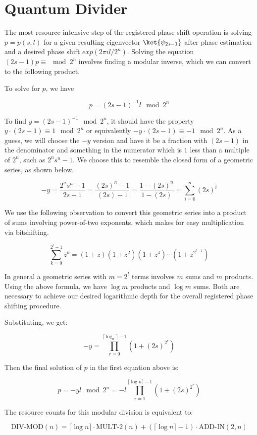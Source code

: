 \section{Quantum Divider}

The most resource-intensive step of the registered phase shift operation
is solving $p = p(s,l)$ for a given resulting
eigenvector $\ket{\psi_{2s-1}}$ after phase estimation and a desired
phase shift $exp(2\pi i l / 2^n)$. Solving the equation
$(2s-1)p \equiv \mod 2^n$ involves finding a modular inverse, which
we can convert to the following product.

To solve for $p$, we have

\begin{displaymath}
p = (2s - 1)^{-1} l \mod 2^n
\end{displaymath}

To find $y = (2s-1)^{-1} \mod 2^n$, it should have the property
$y \cdot (2s-1) \equiv 1 \mod 2^n$ or equivalently
$-y \cdot (2s-1) \equiv -1 \mod 2^n$. As a guess, we will choose the
$-y$ version and have it be a fraction with $(2s-1)$ in the denominator and
something in the numerator which is $1$ less than a multiple of
$2^n$, such as $2^n s^n - 1$.
We choose this to resemble the closed form of a geometric series,
as shown below.

\begin{displaymath}
-y = \frac{2^n s^n - 1}{2s - 1} = \frac{(2s)^n - 1}{(2s) - 1} =
\frac{1 - (2s)^n}{1 - (2s)} = \sum_{i=0}^n (2s)^i
\end{displaymath}

We use the following observation to convert this geometric series into a
product of sums involving power-of-two exponents, which makes for 
easy multiplication via bitshifting.

\begin{displaymath}
\sum_{k=0}^{2^l - 1} z^k = (1 + z)(1 + z^2)(1 + z^4)\cdots(1 + z^{2^{l-1}})
\end{displaymath}

In general a geometric series with $m = 2^l$ terms
involves $m$ sums
and $m$ products. Using the above formula, we have $\log m$ products and
$\log m$ sums. Both are necessary to achieve our desired logarithmic
depth for the overall registered phase shifting procedure.

Substituting, we get:

\begin{displaymath}
-y = \prod_{r=0}^{\lceil \log_n \rceil - 1} (1 + (2s)^{2^r})
\end{displaymath}

Then the final solution of $p$ in the first equation above is:

\begin{displaymath}
p = -yl \mod 2^n = -l \prod_{r=1}^{\lceil \log n \rceil -1} (1 + (2s)^{2^r})
\end{displaymath}

The resource counts for this modular division is equivalent to:

\begin{displaymath}
\text{DIV-MOD}(n) = \lceil \log n \rceil \cdot \text{MULT-2}(n) +
 (\lceil \log n \rceil - 1) \cdot \text{ADD-IN}(2, n)
\end{displaymath}